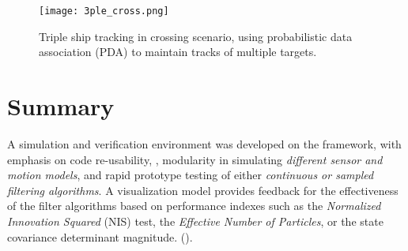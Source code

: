 \begin{figure}[H]
	\centering
	\texttt{[image: 3ple\_cross.png]}
	\caption{Triple ship tracking in crossing scenario, using probabilistic data association (PDA) to maintain tracks of multiple targets.}\label{fig:simulator3}
\end{figure}


\section{Summary}

A simulation and verification environment was developed on the \matlab framework, with emphasis on code re-usability, , modularity in simulating \emph{different sensor and motion models}, and rapid prototype testing of either \emph{continuous or sampled filtering algorithms}. A visualization model provides feedback for the effectiveness of the filter algorithms based on performance indexes such as the \emph{Normalized Innovation Squared} (NIS) test, the \emph{Effective Number of Particles}, or the state covariance determinant magnitude. ().



